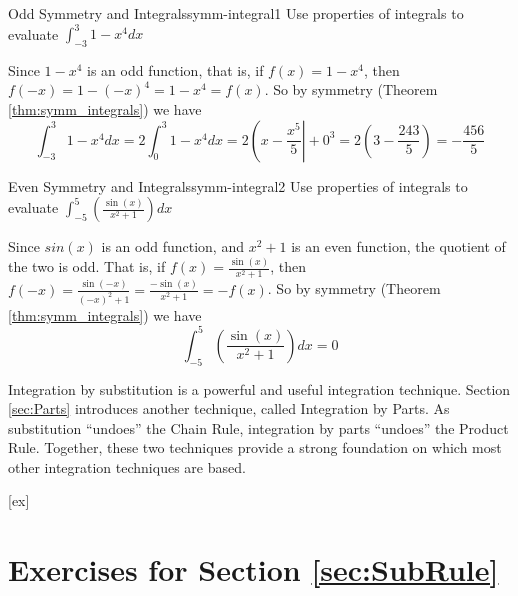 \begin{example}{Odd Symmetry and Integrals}{symm-integral1}
Use properties of integrals to evaluate $\displaystyle \int_{-3}^{3}1-x^4 {d}{x}$
\end{example}

\begin{solution}
Since $ 1-x^4 $ is an odd function, that is, if $ f(x)=1-x^4 $, then $ f(-x) = 1-(-x)^4=1-x^4=f(x)$. So by symmetry (Theorem \ref{thm:symm_integrals}) we have
\[
\int_{-3}^{3}1-x^4 {d}{x}=2\int_{0}^{3}1-x^4 {d}{x}= 2\left(x-\frac{x^5}{5}\right|+0^3=2\left(3-\frac{243}{5} \right)
= -\frac{456}{5}\]
\end{solution}


\begin{example}{Even Symmetry and Integrals}{symm-integral2}
Use properties of integrals to evaluate $\displaystyle{{{\int_{{-{5}}}^{{5}}}{\left(\frac{\sin(x)}{x^2+1} \right)}{d}{x}}}
$
\end{example}

\begin{solution}
Since $ sin(x) $ is an odd function, and $ x^2+1 $ is an even function, the quotient of the two is odd.  That is, if $ f(x)= \frac{\sin(x)}{x^2+1}   $, then $ f(-x) =  \frac{\sin(-x)}{(-x)^2+1}  = \frac{-\sin(x)}{x^2+1} = -f(x) $. So by symmetry (Theorem \ref{thm:symm_integrals}) we have
\[
\int_{-5}^{5}{\left(\frac{\sin(x)}{x^2+1} \right)}{d}{x}=0
\]
\end{solution}


Integration by substitution is a powerful and useful integration technique. Section \ref{sec:Parts} introduces another technique, called Integration by Parts. As substitution ``undoes'' the Chain Rule, integration by parts ``undoes'' the Product Rule. Together, these two techniques provide a strong foundation on which most other integration techniques are based.



[ex]
\section*{Exercises for Section \ref{sec:SubRule}}


